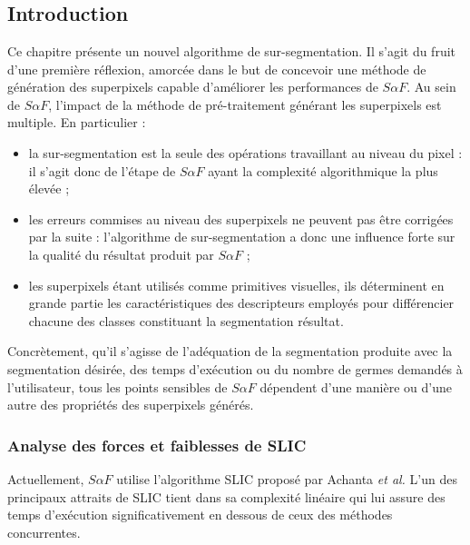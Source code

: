
\chapter{}

\section{Introduction}

Ce chapitre présente un nouvel algorithme de sur-segmentation. Il s'agit du fruit d'une première réflexion, amorcée dans le but de concevoir une méthode de génération des superpixels capable d'améliorer les performances de $S \alpha F$. Au sein de $S \alpha F$, l'impact de la méthode de pré-traitement générant les superpixels est multiple. En particulier :
\begin{itemize}
\item la sur-segmentation est la seule des opérations travaillant au niveau du pixel : il s'agit donc de l'étape de $S \alpha F$ ayant la complexité algorithmique la plus élevée ;
\item les erreurs commises au niveau des superpixels ne peuvent pas être corrigées par la suite : l'algorithme de sur-segmentation a donc une influence forte sur la qualité du résultat produit par $S \alpha F$ ;
\item les superpixels étant utilisés comme primitives visuelles, ils déterminent en grande partie les caractéristiques des descripteurs employés pour différencier chacune des classes constituant la segmentation résultat.
\end{itemize}

Concrètement, qu'il s'agisse de l'adéquation de la segmentation produite avec la segmentation désirée, des temps d'exécution ou du nombre de germes demandés à l'utilisateur, tous les points sensibles de $S \alpha F$ dépendent d'une manière ou d'une autre des propriétés des superpixels générés. 


\subsection{Analyse des forces et faiblesses de SLIC}

Actuellement, $S \alpha F$ utilise l'algorithme SLIC \cite{achanta2012slic} proposé par Achanta \textit{et al.} L'un des principaux attraits de SLIC tient dans sa complexité linéaire qui lui assure des temps d'exécution significativement en dessous de ceux des méthodes concurrentes.

